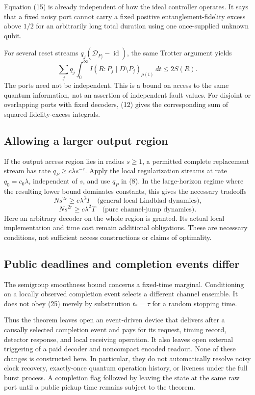 \documentclass[11pt]{article}
\newcommand{\id}{\operatorname{id}}
\newcommand{\D}{\mathcal D}
\begin{document}
Equation (15) is already independent of how the ideal controller operates.
It says that a fixed noisy port cannot carry a fixed positive
entanglement-fidelity excess above \(1/2\) for an arbitrarily long total
duration using one once-supplied unknown qubit.

For several reset streams \(q_j(\D_{P_j}-\id)\), the same Trotter
argument yields
\[
 \sum_jq_j\int_0^\infty
        I(R:P_j\mid D\setminus P_j)_{\rho(t)}\,dt
       \leq2S(R).
 \tag{29}
\]
The ports need not be independent. This is a bound on access to the
same quantum information, not an assertion of independent fault values.
For disjoint or overlapping ports with fixed decoders, (12) gives
the corresponding sum of squared fidelity-excess integrals.

\subsection{Allowing a larger output region}

If the output access region lies in radius \(s\geq1\), a permitted
complete replacement stream has rate
\(q_P\geq c\lambda s^{-r}\). Apply the local regularization streams
at rate \(q_0=c_0\lambda\), independent of \(s\), and use \(q_P\)
in (8). In the large-horizon regime where the resulting lower bound
dominates constants, this gives the necessary tradeoffs
\[
 N s^{2r}\geq c\lambda^3T
       \quad\text{(general local Lindblad dynamics),}
 \tag{30}
\]
\[
 N s^{2r}\geq c\lambda^2T
       \quad\text{(pure channel-jump dynamics).}
 \tag{31}
\]
Here an arbitrary decoder on the whole region is granted. Its actual
local implementation and time cost remain additional obligations.
These are necessary conditions, not sufficient access constructions
or claims of optimality.

\subsection{Public deadlines and completion events differ}

The semigroup smoothness bound concerns a fixed-time marginal.
Conditioning on a locally observed completion event selects a different
channel ensemble. It does not obey (25) merely by substitution
\(t_*=\tau\) for a random stopping time.

Thus the theorem leaves open an event-driven device that delivers after
a causally selected completion event and pays for its request, timing
record, detector response, and local receiving operation. It also leaves
open external triggering of a paid decoder and noncompact encoded
readout. None of these changes is constructed here. In particular,
they do not automatically resolve noisy clock recovery, exactly-once
quantum operation history, or liveness under the full burst process.
A completion flag followed by leaving the state at the same raw port
until a public pickup time remains subject to the theorem.
\end{document}
